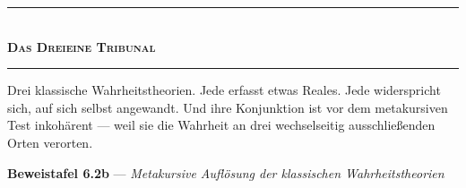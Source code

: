 \documentclass[10pt, openany, oneside]{book}
\renewcommand{\normalsize}{\fontsize{10}{13}\selectfont}
\begin{document}
\begin{center}
    \rule{0.3\textwidth}{0.4pt}\\[0.5em]
    {\normalsize\bfseries\scshape Das Dreieine Tribunal}\\[0.3em]
    \rule{0.3\textwidth}{0.4pt}
\end{center}

\vspace{1em}

\noindent Drei klassische Wahrheitstheorien. Jede erfasst etwas Reales. Jede widerspricht sich, auf sich selbst angewandt. Und ihre Konjunktion ist vor dem metakursiven Test inkohärent --- weil sie die Wahrheit an drei wechselseitig ausschließenden Orten verorten.

\vspace{0.5em}

\textbf{Beweistafel 6.2b} --- \textit{Metakursive Auflösung der klassischen Wahrheitstheorien}

\vspace{0.5em}
\end{document}
